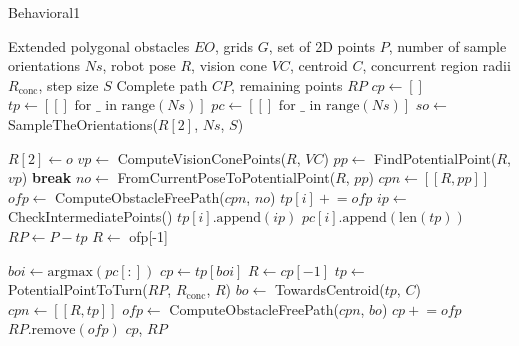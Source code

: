 \begin{algorithm}[H]
    \caption{Behavioral1}
    \label{alg:behavioral1}
    \begin{algorithmic}[1]
    \Require Extended polygonal obstacles $EO$, grids $G$, set of 2D points $P$, number of sample orientations $Ns$, robot pose $R$, vision cone $VC$, centroid $C$, concurrent region radii $R_{\text{conc}}$, step size $S$
    \Ensure Complete path $CP$, remaining points $RP$
    \State $cp \leftarrow []$
    \State $tp \leftarrow [[] \text{ for } \_ \text{ in range}(Ns)]$
    \State $pc \leftarrow [[] \text{ for } \_ \text{ in range}(Ns)]$
    \State $so \leftarrow$ SampleTheOrientations($R[2]$, $Ns$, $S$)
    
        \State $R[2] \leftarrow o$
            \State $vp \leftarrow$ ComputeVisionConePoints($R$, $VC$)
            \State $pp \leftarrow$ FindPotentialPoint($R$, $vp$)
                \State \textbf{break}
            \EndIf
            \State $no \leftarrow$ FromCurrentPoseToPotentialPoint($R$, $pp$)
            \State $cpn \leftarrow [[R, pp]]$
            \State $ofp \leftarrow$ ComputeObstacleFreePath($cpn$, $no$)
            \State $tp[i] \mathrel{+}= ofp$
            \State $ip \leftarrow$ CheckIntermediatePoints()
            \State $tp[i].\text{append}(ip)$
            \State $pc[i].\text{append}(\text{len}(tp))$
            \State $RP \leftarrow P - tp$
            \State $R \leftarrow$ ofp[-1]
        \EndWhile
    \EndFor
    
    \State $boi \leftarrow \text{argmax}(pc[:])$
    \State $cp \leftarrow tp[boi]$
    \State $R \leftarrow cp[-1]$
    \State $tp \leftarrow$ PotentialPointToTurn($RP$, $R_{\text{conc}}$, $R$)
    \State $bo \leftarrow$ TowardsCentroid($tp$, $C$)
    \State $cpn \leftarrow [[R, tp]]$
    \State $ofp \leftarrow$ ComputeObstacleFreePath($cpn$, $bo$)
    \State $cp \mathrel{+}= ofp$
    \State $RP.\text{remove}(ofp)$
    \State \Return $cp$, $RP$
    \end{algorithmic}
    \end{algorithm}
    
